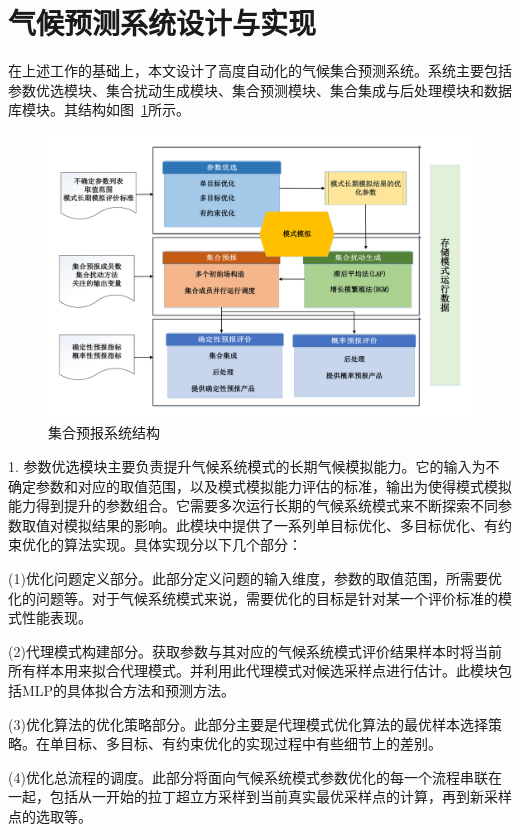 \section{气候预测系统设计与实现}
在上述工作的基础上，本文设计了高度自动化的气候集合预测系统。系统主要包括参数优选模块、集合扰动生成模块、集合预测模块、集合集成与后处理模块和数据库模块。其结构如图~\ref{fig:forecast struct}所示。
\begin{figure}[H] %
  \centering
  \includegraphics[scale=0.42]{figures/混合集合系统.pdf}
  \caption{集合预报系统结构}
  \label{fig:forecast struct}
\end{figure} 
1. 参数优选模块主要负责提升气候系统模式的长期气候模拟能力。它的输入为不确定参数和对应的取值范围，以及模式模拟能力评估的标准，输出为使得模式模拟能力得到提升的参数组合。它需要多次运行长期的气候系统模式来不断探索不同参数取值对模拟结果的影响。此模块中提供了一系列单目标优化、多目标优化、有约束优化的算法实现。具体实现分以下几个部分：

(1)优化问题定义部分。此部分定义问题的输入维度，参数的取值范围，所需要优化的问题等。对于气候系统模式来说，需要优化的目标是针对某一个评价标准的模式性能表现。

(2)代理模式构建部分。获取参数与其对应的气候系统模式评价结果样本时将当前所有样本用来拟合代理模式。并利用此代理模式对候选采样点进行估计。此模块包括MLP的具体拟合方法和预测方法。

(3)优化算法的优化策略部分。此部分主要是代理模式优化算法的最优样本选择策略。在单目标、多目标、有约束优化的实现过程中有些细节上的差别。

(4)优化总流程的调度。此部分将面向气候系统模式参数优化的每一个流程串联在一起，包括从一开始的拉丁超立方采样到当前真实最优采样点的计算，再到新采样点的选取等。

